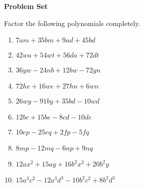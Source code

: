 \textbf{Problem Set}

\vspce

Factor the following polynomials completely.  
\begin{enumerate} 
\item \hspce $7am + 35bm + 9ad + 45bd$
\item \hspce $42wa + 54wt + 56da + 72dt$
\item \hspce $36yw - 24nb + 12bw - 72yn$
\item \hspce $72he + 16we + 27hn + 6wn$
\item \hspce $26wy - 91by + 35bd - 10wd$
\item \hspce $12 b c + 15 b e - 8 c d - 10 d e$

\item \hspce $10 e p - 25 e q + 2 f p - 5 f q$

\item \hspce $8 m p - 12 m q - 6 n p + 9 n q$

\item \hspce $12 a x^{2} + 15 a y + 16 b^{2} x^{2} + 20 b^{2} y$

\item \hspce $15 a^{3} c^{2} - 12 a^{3} d^{3} - 10 b^{2} c^{2} + 8 b^{2} d^{3}$
\end{enumerate}